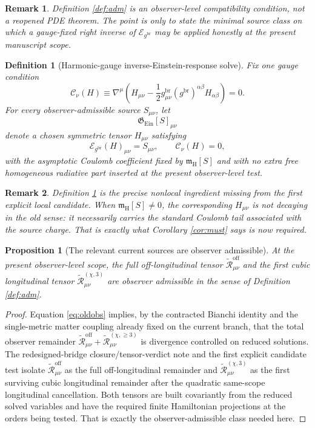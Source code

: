 \documentclass[11pt]{article}
\newcommand{\ReBridge}{g^{\mathrm{br}}}
\newcommand{\ReOff}{\widetilde{\mathcal R}_{\mu\nu}^{\mathrm{off}}}
\newcommand{\ReLong}{\widetilde{\mathcal R}_{\mu\nu}^{(\chi,\ge 3)}}
\newcommand{\ReLongThree}{\widetilde{\mathcal R}_{\mu\nu}^{(\chi,3)}}
\newcommand{\EinLin}{\mathcal E_{\ReBridge}}
\newcommand{\EinInv}{\mathfrak G_{\mathrm{Ein}}}
\newcommand{\GaugeH}{\mathcal C}
\newcommand{\HamCharge}{\mathfrak m_{\mathrm H}}
\newtheorem{definition}{Definition}
\newtheorem{proposition}{Proposition}
\newtheorem{remark}{Remark}
\begin{document}
\begin{remark}
Definition \ref{def:adm} is an observer-level compatibility condition, not a reopened PDE theorem. The point is only to state the minimal source class on which a gauge-fixed right inverse of \(\EinLin\) may be applied honestly at the present manuscript scope.
\end{remark}

\begin{definition}[Harmonic-gauge inverse-Einstein-response solve]
\label{def:inverse}
Fix one gauge condition
\begin{equation}
\GaugeH_\nu(H)
\equiv
\nabla^\mu\!\left(
H_{\mu\nu}
-\frac12 \ReBridge_{\mu\nu}(\ReBridge)^{\alpha\beta}H_{\alpha\beta}
\right)
=0.
\label{eq:gauge}
\end{equation}
For every observer-admissible source \(S_{\mu\nu}\), let
\begin{equation}
\EinInv[S]_{\mu\nu}
\label{eq:inverse}
\end{equation}
denote a chosen symmetric tensor \(H_{\mu\nu}\) satisfying
\begin{equation}
\EinLin(H)_{\mu\nu}=S_{\mu\nu},
\qquad
\GaugeH_\nu(H)=0,
\label{eq:rightinverse}
\end{equation}
with the asymptotic Coulomb coefficient fixed by \(\HamCharge[S]\) and with no extra free homogeneous radiative part inserted at the present observer-level test.
\end{definition}

\begin{remark}
Definition \ref{def:inverse} is the precise nonlocal ingredient missing from the first explicit local candidate. When \(\HamCharge[S]\neq0\), the corresponding \(H_{\mu\nu}\) is not decaying in the old sense: it necessarily carries the standard Coulomb tail associated with the source charge. That is exactly what Corollary \ref{cor:must} says is now required.
\end{remark}

\begin{proposition}[The relevant current sources are observer admissible]
\label{prop:admissible}
At the present observer-level scope, the full off-longitudinal tensor \(\ReOff\) and the first cubic longitudinal tensor \(\ReLongThree\) are observer admissible in the sense of Definition \ref{def:adm}.
\end{proposition}

\begin{proof}
Equation \eqref{eq:oldobs} implies, by the contracted Bianchi identity and the single-metric matter coupling already fixed on the current branch, that the total observer remainder \(\ReOff+\ReLong\) is divergence controlled on reduced solutions. The redesigned-bridge closure/tensor-verdict note and the first explicit candidate test isolate \(\ReOff\) as the full off-longitudinal remainder and \(\ReLongThree\) as the first surviving cubic longitudinal remainder after the quadratic same-scope longitudinal cancellation. Both tensors are built covariantly from the reduced solved variables and have the required finite Hamiltonian projections at the orders being tested. That is exactly the observer-admissible class needed here.
\end{proof}
\end{document}
